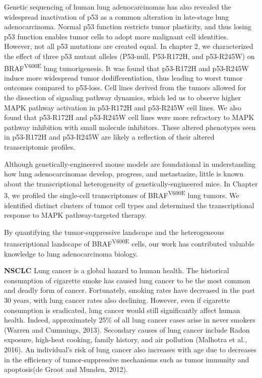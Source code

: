 Genetic sequencing of human lung adenocarcinomas has also revealed the widespread inactivation of p53 as a common alteration in late-stage lung adenocarcinoma. Normal p53 function restricts tumor plasticity, and thus losing p53 function enables tumor cells to adopt more malignant cell identities. However, not all p53 mutations are created equal. In chapter 2, we characterized the effect of three p53 mutant alleles (P53-null, P53-R172H, and p53-R245W) on BRAF\textsuperscript{V600E} lung tumorigenesis. It was found that p53-R172H and p53-R245W induce more widespread tumor dedifferentiation, thus leading to worst tumor outcomes compared to p53-loss. Cell lines derived from the tumors allowed for the dissection of signaling pathway dynamics, which led us to observe higher MAPK pathway activation in p53-R172H and p53-R245W cell lines. We also found that p53-R172H and p53-R245W cell lines were more refractory to MAPK pathway inhibition with small molecule inhibitors. These altered phenotypes seen in p53-R172H and p53-R245W are likely a reflection of their altered transcriptomic profiles.

Although genetically-engineered mouse models are foundational in understanding how lung adenocarcinomas develop, progress, and metastasize, little is known about the transcriptional heterogeneity of genetically-engineered mice. In Chapter 3, we profiled the single-cell transcriptomes of BRAF\textsuperscript{V600E} lung tumors. We identified distinct clusters of tumor cell types and determined the transcriptional response to MAPK pathway-targeted therapy.

By quantifying the tumor-suppressive landscape and the heterogeneous transcriptional landscape of BRAF\textsuperscript{V600E} cells, our work has contributed valuable knowledge to lung adenocarcinoma biology.

\textbf{NSCLC} Lung cancer is a global hazard to human health. The historical consumption of cigarette smoke has caused lung cancer to be the most common and deadly form of cancer. Fortunately, smoking rates have decreased in the past 30 years, with lung cancer rates also declining. However, even if cigarette consumption is eradicated, lung cancer would still significantly affect human health. Indeed, approximately 25\% of all lung cancer cases arise in never smokers (Warren and Cummings, 2013). Secondary causes of lung cancer include Radon exposure, high-heat cooking, family history, and air pollution (Malhotra et al., 2016). An individual's risk of lung cancer also increases with age due to decreases in the efficiency of tumor-suppressive mechanisms such as tumor immunity and apoptosis(de Groot and Munden, 2012).

